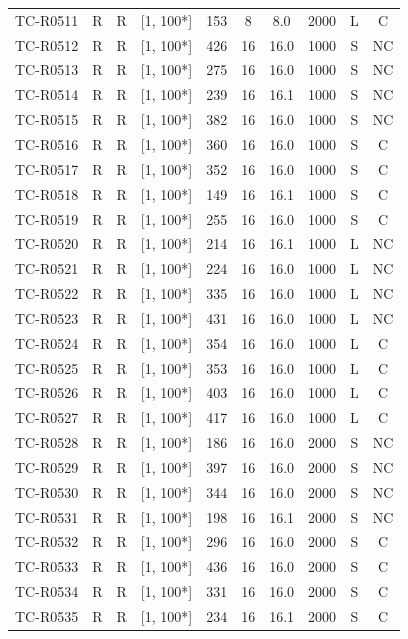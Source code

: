 \begin{longtable}{lccccccccc}
TC-R0511 & R & R & [1, 100*] & 153 & 8 & 8.0 & 2000 & L & C \\
TC-R0512 & R & R & [1, 100*] & 426 & 16 & 16.0 & 1000 & S & NC \\
TC-R0513 & R & R & [1, 100*] & 275 & 16 & 16.0 & 1000 & S & NC \\
TC-R0514 & R & R & [1, 100*] & 239 & 16 & 16.1 & 1000 & S & NC \\
TC-R0515 & R & R & [1, 100*] & 382 & 16 & 16.0 & 1000 & S & NC \\
TC-R0516 & R & R & [1, 100*] & 360 & 16 & 16.0 & 1000 & S & C \\
TC-R0517 & R & R & [1, 100*] & 352 & 16 & 16.0 & 1000 & S & C \\
TC-R0518 & R & R & [1, 100*] & 149 & 16 & 16.1 & 1000 & S & C \\
TC-R0519 & R & R & [1, 100*] & 255 & 16 & 16.0 & 1000 & S & C \\
TC-R0520 & R & R & [1, 100*] & 214 & 16 & 16.1 & 1000 & L & NC \\
TC-R0521 & R & R & [1, 100*] & 224 & 16 & 16.0 & 1000 & L & NC \\
TC-R0522 & R & R & [1, 100*] & 335 & 16 & 16.0 & 1000 & L & NC \\
TC-R0523 & R & R & [1, 100*] & 431 & 16 & 16.0 & 1000 & L & NC \\
TC-R0524 & R & R & [1, 100*] & 354 & 16 & 16.0 & 1000 & L & C \\
TC-R0525 & R & R & [1, 100*] & 353 & 16 & 16.0 & 1000 & L & C \\
TC-R0526 & R & R & [1, 100*] & 403 & 16 & 16.0 & 1000 & L & C \\
TC-R0527 & R & R & [1, 100*] & 417 & 16 & 16.0 & 1000 & L & C \\
TC-R0528 & R & R & [1, 100*] & 186 & 16 & 16.0 & 2000 & S & NC \\
TC-R0529 & R & R & [1, 100*] & 397 & 16 & 16.0 & 2000 & S & NC \\
TC-R0530 & R & R & [1, 100*] & 344 & 16 & 16.0 & 2000 & S & NC \\
TC-R0531 & R & R & [1, 100*] & 198 & 16 & 16.1 & 2000 & S & NC \\
TC-R0532 & R & R & [1, 100*] & 296 & 16 & 16.0 & 2000 & S & C \\
TC-R0533 & R & R & [1, 100*] & 436 & 16 & 16.0 & 2000 & S & C \\
TC-R0534 & R & R & [1, 100*] & 331 & 16 & 16.0 & 2000 & S & C \\
TC-R0535 & R & R & [1, 100*] & 234 & 16 & 16.1 & 2000 & S & C \\

\end{longtable}
